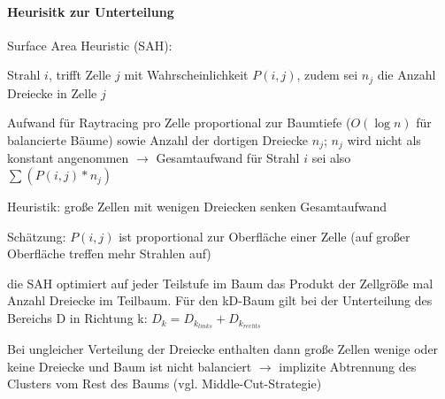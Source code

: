 \documentclass[landscape]{article}
\begin{document}
\begin{multicols}{3}
  \paragraph*{Heurisitk zur Unterteilung}
  \begin{itemize*}
    \item Surface Area Heuristic (SAH):
    \begin{itemize*}
      \item Strahl $i$, trifft Zelle $j$ mit Wahrscheinlichkeit $P(i,j)$, zudem sei $n_j$ die Anzahl Dreiecke in Zelle $j$
      \item Aufwand für Raytracing pro Zelle proportional zur Baumtiefe ($O(\log n)$ für balancierte Bäume) sowie Anzahl der dortigen Dreiecke $n_j$; $n_j$ wird nicht als konstant angenommen $\rightarrow$ Gesamtaufwand für Strahl $i$ sei also $\sum(P(i,j)*n_j)$
    \end{itemize*}
    \item Heuristik: große Zellen mit wenigen Dreiecken senken Gesamtaufwand
    \begin{itemize*}
      \item Schätzung: $P(i,j)$ ist proportional zur Oberfläche einer Zelle (auf großer Oberfläche treffen mehr Strahlen auf)
      \item die SAH optimiert auf jeder Teilstufe im Baum das Produkt der Zellgröße mal Anzahl Dreiecke im Teilbaum. Für den kD-Baum gilt bei der Unterteilung des Bereichs D in Richtung k: $D_k = D_{k_{links}} + D_{k_{rechts}}$
    \end{itemize*}
    \item Bei ungleicher Verteilung der Dreiecke enthalten dann große Zellen wenige oder keine Dreiecke und Baum ist nicht balanciert $\rightarrow$ implizite Abtrennung des Clusters vom Rest des Baums (vgl. Middle-Cut-Strategie)
  \end{itemize*}
  

\end{multicols}
\end{document}
